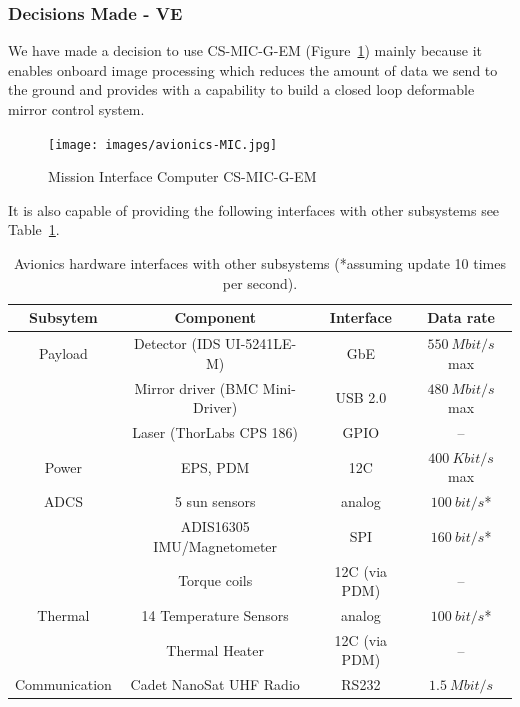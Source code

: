 \documentclass[12pt]{article}
\begin{document}
\subsubsection{Decisions Made - VE}

We have made a decision to use CS-MIC-G-EM (Figure~\ref{fig:avionics_MIC}) mainly because it enables onboard image processing which reduces the amount of data we send to the ground and provides with a capability to build a closed loop deformable mirror control system.

\begin{figure}[ht]
\centering
  \texttt{[image: images/avionics-MIC.jpg]}
\caption{Mission Interface Computer CS-MIC-G-EM \cite{avionics_clyde_space}}
\label{fig:avionics_MIC}
\end{figure}

It is also capable of providing the following interfaces with other subsystems see Table~\ref{table:avionics_interfaces}.

\begin{table}[ht]
\caption{Avionics hardware interfaces with other subsystems (*assuming update 10 times per second).}
\label{table:avionics_interfaces}
\begin{center}
    \begin{tabular}{| c | c | c | c |} \hline
    	Subsytem & Component & Interface & Data rate \\ \hline \hline
    Payload & Detector (IDS UI-5241LE-M) & GbE & $550\ Mbit/s$ max  \\
     & Mirror driver (BMC Mini-Driver) & USB 2.0 & $480\ Mbit/s$ max \\
     & Laser (ThorLabs CPS 186) & GPIO & -- \\ \hline
    Power & EPS, PDM & 12C & $400\ Kbit/s$ max \\ \hline
    ADCS & 5 sun sensors & analog & $100\ bit/s$* \\
     & ADIS16305 IMU/Magnetometer & SPI & $160\ bit/s$* \\
     & Torque coils & 12C (via PDM) & -- \\ \hline
    Thermal & 14 Temperature Sensors & analog & $100\ bit/s$* \\
     & Thermal Heater & 12C (via PDM) & -- \\ \hline
    Communication & Cadet NanoSat UHF Radio & RS232 & $1.5\ Mbit/s$ \\ \hline 
    \end{tabular}
\end{center}
\end{table}
\end{document}

